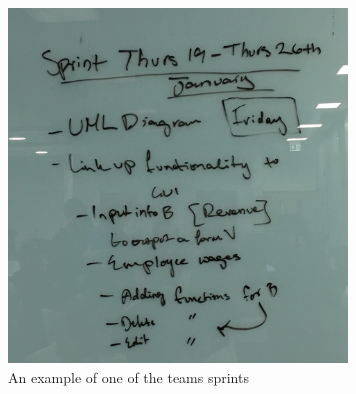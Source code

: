 \begin{figure}[!h]
\begin{center}
\includegraphics[width=9cm]{figures/sprint}
\end{center}
\caption{An example of one of the teams sprints}
\label{fig:agilemethod}
\end{figure}

